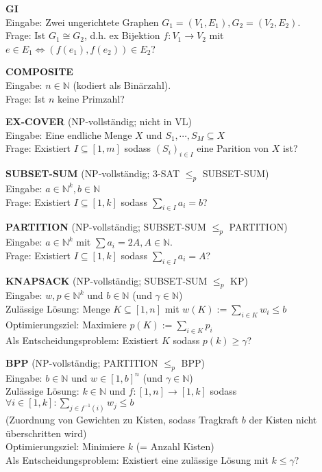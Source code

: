 \documentclass[a4paper,graphics,11pt]{article}
\begin{document}
\textbf{GI}
\\[5pt]
Eingabe: Zwei ungerichtete Graphen $G_1= (V_1,E_1), G_2=(V_2,E_2)$.
\\[5pt]
Frage: Ist $G_1 \cong G_2$, d.h. ex Bijektion $f:V_1 \to V_2$ mit $e \in E_1 \iff (f(e_1),f(e_2)) \in E_2$?

\strut

\textbf{COMPOSITE}
\\[5pt]
Eingabe: $n \in \mathbb{N}$ (kodiert als Binärzahl).
\\[5pt]
Frage: Ist $n$ keine Primzahl?

\strut

\textbf{EX-COVER} (\textsf{NP}-vollständig; nicht in VL)
\\[5pt]
Eingabe: Eine endliche Menge $X$ und $S_1,\cdots,S_M \subseteq X$
\\[5pt]
Frage: Existiert $I \subseteq [1,m]$ sodass $(S_i)_{i \in I}$ eine Parition von $X$ ist?

\newpage

\textbf{SUBSET-SUM} (\textsf{NP}-vollständig; 3-SAT $\leq_p$ SUBSET-SUM)
\\[5pt]
Eingabe: $a \in \mathbb{N}^k, b \in \mathbb{N}$
\\[5pt]
Frage: Existiert $I \subseteq [1,k]$ sodass $\displaystyle \sum_{i \in I}a_i = b$?

\strut

\textbf{PARTITION} (\textsf{NP}-vollständig; SUBSET-SUM $\leq_p$ PARTITION)
\\[5pt]
Eingabe: $a \in \mathbb{N}^k$ mit $\sum a_i = 2A, A \in \mathbb{N}$.
\\[5pt]
Frage: Existiert $I \subseteq [1,k]$ sodass $\displaystyle \sum_{i \in I}a_i = A$?

\strut

\textbf{KNAPSACK} (\textsf{NP}-vollständig; SUBSET-SUM $\leq_p$ KP)
\\[10pt]
Eingabe: $w,p \in \mathbb{N}^k$ und $b\in \mathbb{N}$ (und $\gamma \in \mathbb{N}$)
\\[10pt]
Zulässige Lösung: Menge $K \subseteq [1,n]$ mit $w(K) := \sum_{i \in K} w_i \leq b$
\\[10pt]
Optimierungsziel: Maximiere $p(K) := \sum_{i \in K} p_i$
\\[10pt]
Als Entscheidungsproblem: Existiert $K$ sodass $p(k) \geq \gamma$?

\strut

\textbf{BPP} (\textsf{NP}-vollständig; PARTITION $\leq_p$ BPP)
\\[10pt]
Eingabe: $b \in \mathbb{N}$ und $w \in [1,b]^n$ (und $\gamma \in \mathbb{N}$)
\\[10pt]
Zulässige Lösung: $k \in \mathbb{N}$ und $f : [1,n] \to [1,k]$ sodass
$\displaystyle\forall i \in [1,k]: \sum_{j \in f^{-1}(i)} w_j \leq b$\\
(Zuordnung von Gewichten zu Kisten, sodass Tragkraft $b$ der Kisten nicht überschritten wird)
\\[10pt]
Optimierungsziel: Minimiere $k$ (= Anzahl Kisten)
\\[10pt]
Als Entscheidungsproblem: Existiert eine zulässige Lösung mit $k \leq \gamma$?
\end{document}
